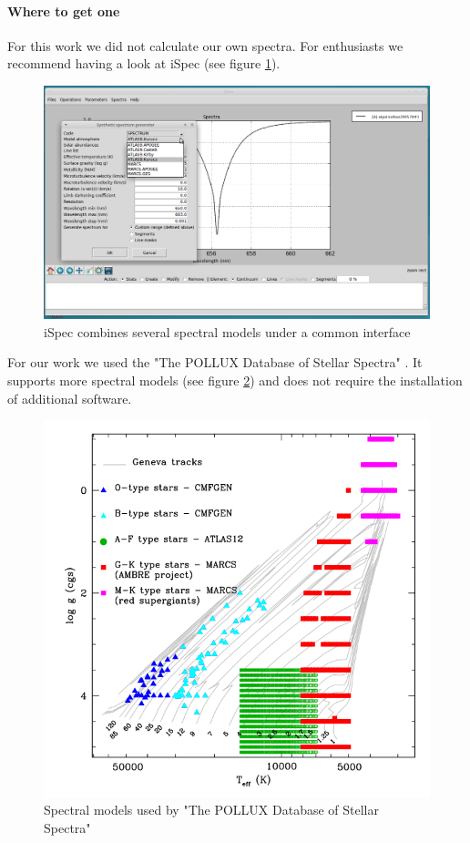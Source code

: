 \documentclass[10pt,a4paper,notitlepage,twocolumn]{article}
\begin{document}
\paragraph{Where to get one}
For this work we did not calculate our own spectra.
For enthusiasts we recommend having a look at iSpec \cite{BlancoCuaresmaSoubiranHeiter2014} (see figure \ref{fig:iSpec}).
\begin{figure}[ht]
	\includegraphics[width=\columnwidth]{img/iSpec.png}
	\caption{iSpec combines several spectral models under a common interface \cite{BlancoCuaresmaSoubiranHeiter2014}}
	\label{fig:iSpec}
\end{figure}

For our work we used the "The POLLUX Database of Stellar Spectra" \cite{Pollux2010}. It supports more spectral models (see figure \ref{fig:pollux}) and does not require the installation of additional software.
\begin{figure}[ht]
	\includegraphics[width=\columnwidth]{img/pollux_models.png}
	\caption{Spectral models used by "The POLLUX Database of Stellar Spectra" \cite{Pollux2010}}
	\label{fig:pollux}
\end{figure}
\end{document}
